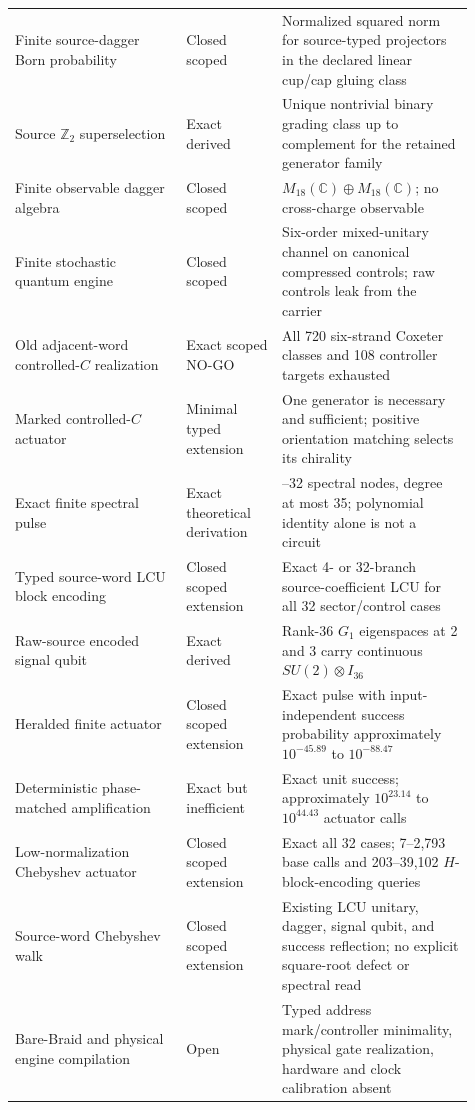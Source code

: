 \documentclass[11pt]{article}
\theoremstyle{definition}
\theoremstyle{remark}
\begin{document}
\begin{longtable}{>{\raggedright\arraybackslash}p{0.34\linewidth} >{\raggedright\arraybackslash}p{0.19\linewidth} >{\raggedright\arraybackslash}p{0.38\linewidth}}
Finite source-dagger Born probability & Closed scoped & Normalized squared norm for source-typed projectors in the declared linear cup/cap gluing class \\
Source $\mathbb Z_2$ superselection & Exact derived & Unique nontrivial binary grading class up to complement for the retained generator family \\
Finite observable dagger algebra & Closed scoped & $M_{18}(\mathbb C)\oplus M_{18}(\mathbb C)$; no cross-charge observable \\
Finite stochastic quantum engine & Closed scoped & Six-order mixed-unitary channel on canonical compressed controls; raw controls leak from the carrier \\
Old adjacent-word controlled-$C$ realization & Exact scoped NO-GO & All 720 six-strand Coxeter classes and 108 controller targets exhausted \\
Marked controlled-$C$ actuator & Minimal typed extension & One generator is necessary and sufficient; positive orientation matching selects its chirality \\
Exact finite spectral pulse & Exact theoretical derivation & 15--32 spectral nodes, degree at most 35; polynomial identity alone is not a circuit \\
Typed source-word LCU block encoding & Closed scoped extension & Exact 4- or 32-branch source-coefficient LCU for all 32 sector/control cases \\
Raw-source encoded signal qubit & Exact derived & Rank-36 $G_1$ eigenspaces at 2 and 3 carry continuous $SU(2)\otimes I_{36}$ \\
Heralded finite actuator & Closed scoped extension & Exact pulse with input-independent success probability approximately $10^{-45.89}$ to $10^{-88.47}$ \\
Deterministic phase-matched amplification & Exact but inefficient & Exact unit success; approximately $10^{23.14}$ to $10^{44.43}$ actuator calls \\
Low-normalization Chebyshev actuator & Closed scoped extension & Exact all 32 cases; 7--2,793 base calls and 203--39,102 $H$-block-encoding queries \\
Source-word Chebyshev walk & Closed scoped extension & Existing LCU unitary, dagger, signal qubit, and success reflection; no explicit square-root defect or spectral read \\
Bare-Braid and physical engine compilation & Open & Typed address mark/controller minimality, physical gate realization, hardware and clock calibration absent \\

\end{longtable}
\end{document}
